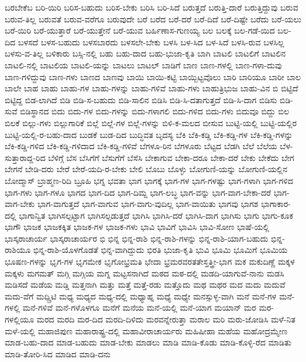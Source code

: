 {ಬರಬೇಕೆಬ
ಬರಿ-ಯಿರಿ
ಬರಿಸ-ಬಹುದು
ಬರಿಸ-ಬೇಕು
ಬರಿಸಿ
ಬರಿ-ಸಿದೆ
ಬರುತ್ತದೆ
ಬರುತ್ತಿ-ದಾರೆ
ಬರುತ್ತಿದ್ದುವು
ಬರುವ
ಬರುವ-ತಿಲ್ಲ
ಬರುವತೆ
ಬರುವ-ವರೆಗೂ
ಬರುವುದೇ
ಬರೆ
ಬರೆದ
ಬರೆ-ದರೆ
ಬರೆ-ದಿದೆ
ಬರೆ-ದಿಷ್ಟೇ
ಬರೆದು
ಬರೆ-ಯಲು
ಬರೆ-ಯಿರಿ
ಬರೆ-ಯುತ್ತಾರೆ
ಬರೆ-ಯುತ್ತೇನೆ
ಬರೆ-ಯುವ
ಬರ್ಹಿಣಾಸ-ಗುಣಯ್ಯ
ಬಲ
ಬಲಕ್ಕೆ
ಬಲ-ಗಡೆ-ಯಿದ
ಬಲ-ದಿದ
ಬಳಸದೆ
ಬಳಸ-ಬಹುದು
ಬಳಸಬಾರದು
ಬಳಸಲೇ-ಬೇಕು
ಬಳಸಿ
ಬಳ-ಸಿದ
ಬಳ-ಸಿದೆ
ಬಳಸಿ-ರುವ
ಬಳಸಿಲ್ಲ
ಬಳಸು-ವ-ತಿಲ್ಲ
ಬಳಿಕಾರು
ಬಸ್ಸಿ-ನಲ್ಲಿ
ಬಹು
ಬಹು-ದಾದ
ಬಹು-ಭುಜಾ-ಕೃತಿ
ಬಾಗಿ
ಬಾಟಲಿ
ಬಾಟಲಿಗೆ
ಬಾಟಲಿನ
ಬಾಟಲಿ-ನಲ್ಲಿ
ಬಾಟಲಿಯ
ಬಾಟಲಿ-ಯನ್ನು
ಬಾಟಲು
ಬಾಟಲ್
ಬಾಡಿಗೆ
ಬಾಣ
ಬಾಣ-ಗಳಲ್ಲಿ
ಬಾಣ-ಗಳಾ-ದುವು
ಬಾಣ-ಗಳಿದ್ದುವು
ಬಾಣ-ಗಳು
ಬಾಣದ
ಬಾಣವು
ಬಾಯಿ
ಬಾಯಿ-ಕಟ್ಟಿ
ಬಾಯ್ಬಿಟ್ಟವೊಲು
ಬಾರಿ
ಬಾರಿಯೂ
ಬಾರೀ
ಬಾಲ
ಬಾಲೇ
ಬಾಹ
ಬಾಹು
ಬಾಹು-ಗಳ
ಬಾಹು-ಗಳನ್ನು
ಬಾಹು-ಗಳಿವೆ
ಬಾಹು-ಗಳು
ಬಾಹುತ್ರಿಭುಜ
ಬಾಹು-ವಿನ
ಬಿ
ಬಿಟ್ಟಿದೆ
ಬಿಟ್ಟಿದ್ದ
ಬಿಡ-ಲಾಗಿದೆ
ಬಿಡಿ
ಬಿಡಿ-ಸ-ಬಹುದು
ಬಿಡಿ-ಸಾಲಿನ
ಬಿಡಿಸಿ
ಬಿಡಿ-ಸಿ-ದತಾಗುತ್ತದೆ
ಬಿಡಿ-ಸಿ-ದಾಗ
ಬಿಡಿಸು
ಬಿಡಿ-ಸುವೆ
ಬಿಡಿಸ್ಥಾನದ
ಬಿದು
ಬಿದು-ಗಳ
ಬಿದು-ಗಳನ್ನು
ಬಿದು-ಗಳಾಗಲಿ
ಬಿದು-ಗಳಿದ
ಬಿದು-ಗಳು
ಬಿದುವೂ
ಬಿದ್ದು
ಬಿಲ
ಬಿಲಕೆ
ಬಿಲ್ಲು-ಗಳು
ಬಿಲ್ಲುಗಾರಿಕೆ
ಬಿಲ್ಲೆ
ಬಿಲ್ಲೆ-ಗಳ
ಬಿಲ್ಲೆ-ಗಳನ್ನು
ಬಿಳಿ-ಕ-ಮಲದ
ಬೀಸುವ
ಬುಟ್ಟಿ-ಯಲ್ಲಿ
ಬುಟ್ಟಿ-ಯಲ್ಲಿರ
ಬುಟ್ಟಿ-ಯಲ್ಲಿ-ರ-ಬಹು-ದಾದ
ಬುಡಕೆ
ಬುಡ-ದಿದ
ಬುದ್ಧಿವತ
ಬೃದಸ್ಯ
ಬೆಕಿ
ಬೆಕಿ-ಕಡ್ಡಿ
ಬೆಕಿ-ಕಡ್ಡಿ-ಗಳ
ಬೆಕಿ-ಕಡ್ಡಿ-ಗಳನ್ನು
ಬೆಕಿ-ಕಡ್ಡಿ-ಗಳಿದ
ಬೆಕಿ-ಕಡ್ಡಿ-ಗಳಿದಾದ
ಬೆಕಿ-ಕಡ್ಡಿ-ಗಳಿವೆ
ಬೆಗಳೂ-ರಿನ
ಬೆಗಳೂರು
ಬೆಟ್ಟದ
ಬೆಡಗಿ
ಬೆಲೆ
ಬೆಲೆಯ
ಬೆಳ-ಸುತ್ತಾರಾದ್ದ-ರಿದ
ಬೆಳಿಗ್ಗೆ
ಬೆಸ
ಬೆಸಿಗೆಗೆ
ಬೆಸುಗೆಗೆ
ಬೆಸೆಸಿ
ಬೇಕಾಗುವ
ಬೇಕಾ-ದರೂ
ಬೇಕಾ-ದರೆ
ಬೇಕು
ಬೇಕೆದು
ಬೇಗ
ಬೇಗನೆ
ಬೇಡಿ-ದರು
ಬೇರೆ
ಬೇರೆ-ಯದಿ-ರ-ಬೇಕು
ಬೇಲಿ
ಬೊಬು
ಬೊಳ್ಳು
ಬೋಗುಣಿ-ಯನ್ನು
ಬೋಗುಣಿ-ಯಲ್ಲಿನ
ಬೋದ್ಮಾಸ್
ಬ್ರಾಹ್ಮಣ-ರಿದಿ
ಬ್ರೂಹಿ
ಭಗ್ನ
ಭವತಾ
ಭಾಗ
ಭಾಗಕ್ಕೆ
ಭಾಗ-ಗಳ
ಭಾಗ-ಗಳಷ್ಟು
ಭಾಗ-ಗಳಾಗಿ
ಭಾಗ-ಗಳಿದ
ಭಾಗ-ಗಳು
ಭಾಗ-ಗಳೂ
ಭಾಗದ
ಭಾಗ-ದಿದ
ಭಾಗ-ದಿಮ್ದ
ಭಾಗ-ಲಬ್ಧ
ಭಾಗ-ವನ್ನು
ಭಾಗ-ವಾಗ-ಬೇಕಾ-ದರೆ
ಭಾಗ-ವಾಗ-ಬೇಕು
ಭಾಗ-ವಾಗುತ್ತದೆ
ಭಾಗ-ವಾಗುವ
ಭಾಗ-ವಾಗು-ವುದಿಲ್ಲ
ಭಾಗ-ವಾಯಿತು
ಭಾಗವು
ಭಾಗಶ
ಭಾಗಾಕಾರ-ದಲ್ಲಿ
ಭಾಗಾನ್ವಿತ
ಭಾಗಿಸಲ್ಪಟ್ಟಾಗ
ಭಾಗಿಸಲ್ಪಡುತ್ತದೆ
ಭಾಗಿಸಿ
ಭಾಗಿಸಿ-ದರೆ
ಭಾಗಿಸಿ-ದಾಗ
ಭಾಗಿಸು
ಭಾಗು
ಭಾಗು-ಕೂಕ
ಭಾಗೌ
ಭಾಜಕ
ಭಾಜಕಕ್ಕಿತ
ಭಾಜಕ-ಗಳ
ಭಾಜಕ-ಗಳು
ಭಾವಿ
ಭಾವಿಗೆ
ಭಾವಿಸಿ
ಭಾವಿ-ಸೋಣ
ಭಾಷೆ-ಯಲ್ಲಿ
ಭಾಸ್ಕರಾಚಾರ್ಯ
ಭಾಸ್ಕರಾಚಾರ್ಯರ
ಭಿ
ಭಿನ್ನ
ಭಿನ್ನ-ರಾಶಿ
ಭಿನ್ನ-ರಾಶಿ-ಗಳನ್ನು
ಭಿನ್ನ-ರಾಶಿ-ಯಾಗ-ಬಹುದು
ಭಿನ್ನ-ರಾಶಿಯೂ
ಭಿನ್ನ-ರಾಶಿ-ಯೊಳಗೊಡತೆ
ಭಿನ್ನ-ವಾಗಿದ್ದುದು
ಭಿರತಿ
ಭುಜಾ-ಕೃತಿ
ಭುವಿ
ಭೂಮಿ
ಭೂಮಿಗೆ
ಭೂಮಿಯ
ಭೂಷಣ-ಗಳನ್ನು
ಭೃಗ-ಗಳ
ಭೃಗಮೇಕ
ಭೃಗೋಭ್ರಮತಿ
ಭೇದಾ
ಭ್ರಮರವರತತೇಸ್ತತ್ತ್ರೀ-ಭಾಗ
ಮಕ
ಮಕುದಿಣ್ಣೆ
ಮಕ್ಕಳ
ಮಕ್ಕಳು
ಮಗಮತ್
ಮಗ್ಗಿ
ಮಗ್ಗಿಯ
ಮಗ್ನ
ಮಟ್ಟಸನಾಗಿದೆ
ಮಠದ
ಮಠ-ದಲ್ಲಿ
ಮಡದಿ-ಯಾಗುವೆ-ನಾನು
ಮಡಸಿ
ಮಡಿಸದೆ
ಮಡೆಯ
ಮಡ್ಡಿ
ಮತ್ತನಾಗಿ
ಮತ್ತು
ಮತ್ತೆ
ಮತ್ತೆ-ರಡು
ಮತ್ತೊದು
ಮಥ
ಮಥರ
ಮದ
ಮದು
ಮದುವೆ
ಮದು-ವೆಗೆ
ಮದ್ಷ್ರಿಟಿ
ಮಧ್ಯ
ಮಧ್ಯದ
ಮಧ್ಯ-ದಲ್ಲಿ
ಮಧ್ಯಾಹ್ನ
ಮಧ್ಯೆ
ಮಧ್ಯೇ
ಮನಸ್ಸುಳ್ಳ-ವಾಗಿ
ಮನೆ
ಮನೆ-ಗಳ
ಮನೆ-ಗಳಲ್ಲಿ
ಮನೆ-ಗಳಿವೆ
ಮನೆ-ಗಳೊಳಗೂ
ಮನೆಗೆ
ಮನೆಯ
ಮನೆ-ಯಲ್ಲಿ
ಮನೆ-ಯಾಗ
ಮಯಾನ್
ಮರ
ಮರ-ಗಳಲ್ಲಿಯೂ
ಮರದ
ಮರದಿ
ಮರ-ದಿದ
ಮರದಿ-ದಿಳಿದು
ಮರವನ್ನೇರುತ್ತಾ
ಮರಾಲ
ಮರಿ
ಮರು-ಜೋಡಿಸಿ
ಮಳೆ-ನಿತ
ಮಳೆ-ಯಲ್ಲಿ
ಮಹಾಜಿಪುಣ
ಮಹಾರಾಷ್ಟ್ರ-ದಲ್ಲಿ
ಮಹಾವೀರಾಚಾರ್ಯರು
ಮಹಿಷೀಹಾ
ಮಹೆಯ
ಮಹೋದ್ರಮ್ಮೇಣ
ಮಾಡ-ಬಹು-ದಾದ
ಮಾಡ-ಬಹುದು
ಮಾಡ-ಬೇಕು
ಮಾಡಲು
ಮಾಡಿ
ಮಾಡಿ-ಕೊಡು
ಮಾಡಿ-ಕೊಳ್ಳಿ-ರೆದ
ಮಾಡಿತು
ಮಾಡಿ-ತೋರಿ-ಸಿದ
ಮಾಡಿದ
ಮಾಡಿ-ದನು
}
